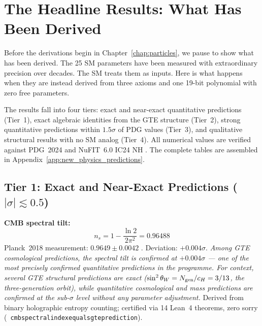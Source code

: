 \documentclass[11pt,openany]{book}
\theoremstyle{remark}
\newcommand{\lean}[1]{%
  \penalty-100
  \begingroup\def\_{\textunderscore\allowbreak}\texttt{#1}\endgroup}
\newcommand{\CatAL}{\ensuremath{\textbf{A}_{\rm Lean}}}
\begin{document}
\section{The Headline Results: What Has Been Derived}
\label{sec:greatest_hits}

Before the derivations begin in Chapter~\ref{chap:particles}, we pause to show what
has been derived.
The 25 SM parameters have been measured with extraordinary precision over decades.
The SM treats them as inputs.
Here is what happens when they are instead derived from three axioms and one 19-bit
polynomial with zero free parameters.

The results fall into four tiers: exact and near-exact quantitative predictions (Tier~1),
exact algebraic identities from the GTE structure (Tier~2), strong quantitative
predictions within $1.5\sigma$ of PDG values (Tier~3), and qualitative structural
results with no SM analog (Tier~4).
All numerical values are verified against PDG~2024 \cite{ParticleDataGroup2024}
and NuFIT~6.0 IC24 NH \cite{NuFIT60}.
The complete tables are assembled in Appendix~\ref{app:new_physics_predictions}.

\subsection*{Tier 1: Exact and Near-Exact Predictions ($|\sigma| \lesssim 0.5$)}

\begin{tcolorbox}[colback=orange!5,colframe=orange!60,title={Single Most Precisely Confirmed GTE Prediction (\CatAL)}]
\textbf{CMB spectral tilt:}
\[
n_s = 1 - \frac{\ln 2}{2\pi^2} = 0.96488
\]
Planck~2018 measurement: $0.9649 \pm 0.0042$ \cite{Planck2018}.
Deviation: $+0.004\sigma$.
\textit{Among GTE cosmological predictions, the spectral tilt is confirmed at $+0.004\sigma$ ---
one of the most precisely confirmed quantitative predictions in the programme.
For context, several GTE structural predictions are exact ($\sin^2\theta_W = N_{\rm gen}/c_H = 3/13$, the three-generation orbit), while quantitative cosmological and mass predictions are confirmed at the sub-$\sigma$ level without any parameter adjustment.}
Derived from binary holographic entropy counting; certified via 14 Lean~4 theorems,
zero sorry \mbox{(\lean{cmb\_spectral\_index\_equals\_gte\_prediction})}.
\end{tcolorbox}
\end{document}
